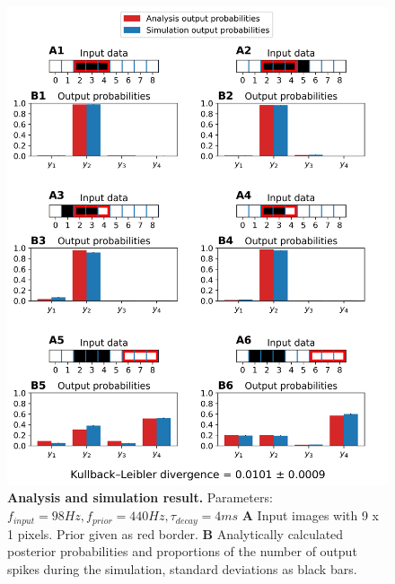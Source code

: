 \begin{figure}
  \includegraphics[width=\linewidth]{figures/1D/1D_98_440_4.png}
    \caption{\textbf{Analysis and simulation result. } Parameters: $f_{input} = 98 Hz, f_{prior} = 440 Hz, \tau_{decay} = 4 ms$ \textbf{A} Input images with 9 x 1 pixels. Prior given as red border. \textbf{B} Analytically calculated posterior probabilities and proportions of the number of output spikes during the simulation, standard deviations as black bars.}
  \label{fig:1D_98_440_4}
\end{figure}

